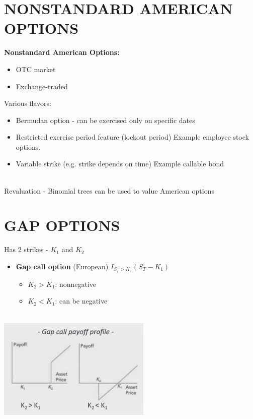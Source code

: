 \documentclass{article}
\begin{document}
\section{NONSTANDARD AMERICAN OPTIONS}
{\bf Nonstandard American Options:}
\begin{itemize}
    \item OTC market 
    \item Exchange-traded

\end{itemize}
Various flavors:

\begin{itemize}
    \item Bermudan option - can be exercised only on specific dates
    \item Restricted exercise period feature (lockout period) Example employee stock options.
    \item Variable strike (e.g. strike depends on time) Example callable bond
\end{itemize}\\
Revaluation - Binomial trees can be used to value American options
\newpage
\section{GAP OPTIONS}


Has 2 strikes - $K_1$ and $K_2$
\begin{itemize}
    \item {\bf Gap call option} (European) $I_{S_T > K_2} (S_T - K_1)$
    \begin{itemize}
        \item $K_2 > K_1$: nonnegative
        \item $K_2 < K_1$: can be negative
    \end{itemize}
\end{itemize}\\
\includegraphics[width=0.55\textwidth]{Gap_call_payoff_profile.png}\\
\end{document}
